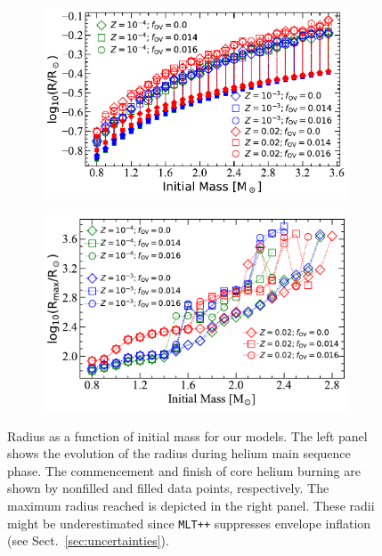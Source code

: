 \documentclass[main.tex]{subfiles}
\begin{document}
\begin{figure}[h!]
    \centering
    \begin{subfigure}{0.5\textwidth}
      \centering
      \includegraphics[width=0.95\columnwidth]{figures/chapter2/mass_radius/radius_vs_mass_tams.pdf}
    \end{subfigure}%
    \begin{subfigure}{0.5\textwidth}
      \centering
      \includegraphics[width=0.95\columnwidth]{figures/chapter2/mass_radius/mass_radius.pdf}
    \end{subfigure}
    \caption{Radius as a function of initial mass for our \seriesone models. The left panel shows the evolution of the radius during helium main sequence phase. The commencement and finish of core helium burning are shown by nonfilled and filled data points, respectively. The maximum radius reached is depicted in the right panel. These radii might be underestimated since \texttt{MLT++}  suppresses envelope inflation (see Sect.~\ref{sec:uncertainties}).}
    \label{fig:mass_radius}
\end{figure}
\end{document}
